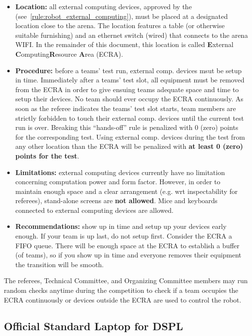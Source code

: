 \begin{itemize}
  \item \textbf{Location:} all external computing devices, approved by the 
  		(see~\ref{rule:robot_external_computing}), must be placed at a designated location close to the arena.
  		The location features a table (or otherwise suitable furnishing) and an ethernet switch (wired)
        that connects to the arena WIFI. In the remainder of this document, this location is called
  		\textbf{E}xternal \textbf{C}omputing\textbf{R}esource \textbf{A}rea (ECRA).
  \item \textbf{Procedure:} before a teams' test run, external comp. devices msut be setup in time.
  		Immediately after a teams' test slot, all equipment must be removed from the ECRA in order to give ensuing
        teams adequate space and time to setup their devices. No team should ever occupy the ECRA continuously.
  		As soon as the referee indicates the teams' test slot starts, team members are strictly forbidden to touch
        their external comp. devices until the current test run is over. Breaking this ``hands-off'' rule
        is penalized with 0 (zero) points for the corresponding test. Using external comp. devices during the test
        from any other location than the ECRA will be penalized with \textbf{at least 0 (zero) points for the test}.
  \item \textbf{Limitations:} external computing devices currently have no limitation concerning computation
  		power and form factor. However, in order to maintain enough space and a	clear arrangement (e.g. wrt
        inspectability for referees), stand-alone screens are \textbf{not allowed}. Mice and keyboards connected
        to external computing devices are allowed.
  \item \textbf{Recommendations:} show up in time and setup up your devices early enough. If your team is up last,
        do not setup first. Consider the ECRA a FIFO queue. There will be enough space at the ECRA to establish a
        buffer (of teams), so if you show up in time and everyone removes their equipment the transition will be smooth.
\end{itemize}

The referees, Technical Committee, and Organizing Committee members may run random checks anytime during the competition
to check if a team occupies the ECRA continuously or devices outside the ECRA are used to control the robot.


\subsection{Official Standard Laptop for DSPL}
\label{rule:osl_dspl}
% 
% 

